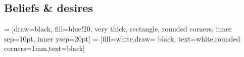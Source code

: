 

\subsection{Beliefs \& desires}




  = [draw=black, fill=blue!20, very thick,  rectangle, rounded corners, inner sep=10pt, inner ysep=20pt]
 = [fill=white,draw= black, text=white,rounded corners=1mm,text=black]


